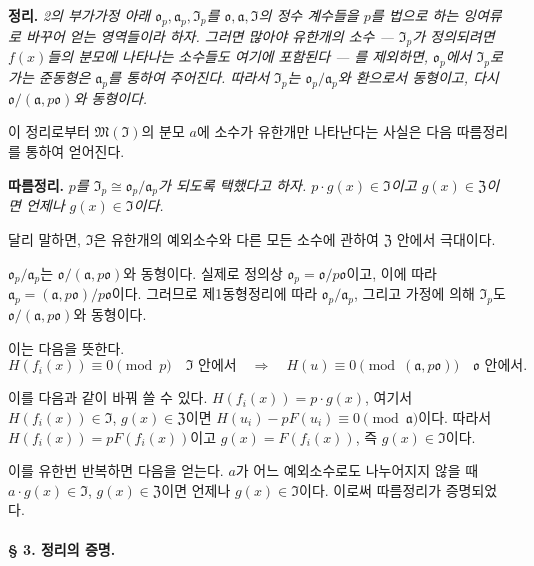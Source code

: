 \textbf{정리.}
\emph{2의 부가가정 아래 \(\mathfrak o_p,\mathfrak a_p,\mathfrak I_p\)를 \(\mathfrak o,\mathfrak a,\mathfrak I\)의 정수 계수들을 \(p\)를 법으로 하는 잉여류로 바꾸어 얻는 영역들이라 하자. 그러면 많아야 유한개의 소수 --- \(\mathfrak I_p\)가 정의되려면 \(f(x)\)들의 분모에 나타나는 소수들도 여기에 포함된다 --- 를 제외하면, \(\mathfrak o_p\)에서 \(\mathfrak I_p\)로 가는 준동형은 \(\mathfrak a_p\)를 통하여 주어진다. 따라서 \(\mathfrak I_p\)는 \(\mathfrak o_p/\mathfrak a_p\)와 환으로서 동형이고, 다시 \(\mathfrak o/(\mathfrak a,p\mathfrak o)\)와 동형이다.}

이 정리로부터 \(\mathfrak M(\mathfrak I)\)의 분모 \(a\)에 소수가 유한개만 나타난다는 사실은 다음 따름정리를 통하여 얻어진다.

\textbf{따름정리.}
\emph{\(p\)를 \(\mathfrak I_p\cong\mathfrak o_p/\mathfrak a_p\)가 되도록 택했다고 하자. \(p\cdot g(x)\in\mathfrak I\)이고 \(g(x)\in\mathfrak Z\)이면 언제나 \(g(x)\in\mathfrak I\)이다.}

달리 말하면, \(\mathfrak I\)은 유한개의 예외소수와 다른 모든 소수에 관하여 \(\mathfrak Z\) 안에서 극대이다.

\(\mathfrak o_p/\mathfrak a_p\)는 \(\mathfrak o/(\mathfrak a,p\mathfrak o)\)와 동형이다. 실제로 정의상 \(\mathfrak o_p=\mathfrak o/p\mathfrak o\)이고, 이에 따라 \(\mathfrak a_p=(\mathfrak a,p\mathfrak o)/p\mathfrak o\)이다. 그러므로 제1동형정리에 따라 \(\mathfrak o_p/\mathfrak a_p\), 그리고 가정에 의해 \(\mathfrak I_p\)도 \(\mathfrak o/(\mathfrak a,p\mathfrak o)\)와 동형이다.

이는 다음을 뜻한다.
\[
H(f_i(x))\equiv0\pmod p\quad\text{\(\mathfrak I\) 안에서}
\quad\Longrightarrow\quad
H(u)\equiv0\pmod{(\mathfrak a,p\mathfrak o)}
\quad\text{\(\mathfrak o\) 안에서}.
\]

이를 다음과 같이 바꿔 쓸 수 있다. \(H(f_i(x))=p\cdot g(x)\), 여기서 \(H(f_i(x))\in\mathfrak I\), \(g(x)\in\mathfrak Z\)이면 \(H(u_i)-pF(u_i)\equiv0\pmod{\mathfrak a}\)이다. 따라서 \(H(f_i(x))=pF(f_i(x))\)이고 \(g(x)=F(f_i(x))\), 즉 \(g(x)\in\mathfrak I\)이다.

이를 유한번 반복하면 다음을 얻는다. \(a\)가 어느 예외소수로도 나누어지지 않을 때 \(a\cdot g(x)\in\mathfrak I\), \(g(x)\in\mathfrak Z\)이면 언제나 \(g(x)\in\mathfrak I\)이다. 이로써 따름정리가 증명되었다.

\bigskip
\paragraph{§ 3. 정리의 증명.}

